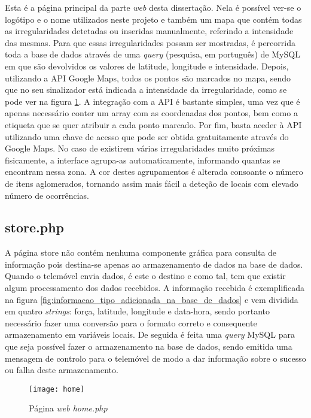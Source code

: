 Esta é a página principal da parte \emph{web} desta dissertação.
Nela é possível ver-se o logótipo e o nome utilizados neste projeto e também um mapa que contém todas as irregularidades detetadas ou inseridas manualmente, referindo a intensidade das mesmas.
Para que essas irregularidades possam ser mostradas, é percorrida toda a base de dados através de uma \emph{query} (pesquisa, em português) de MySQL em que são devolvidos os valores de latitude, longitude e intensidade.
Depois, utilizando a API Google Maps, todos os pontos são marcados no mapa, sendo que no seu sinalizador está indicada a intensidade da irregularidade, como se pode ver na figura \ref{fig:home.php}.
A integração com a API é bastante simples, uma vez que é apenas necessário conter um array com as coordenadas dos pontos, bem como a etiqueta que se quer atribuir a cada ponto marcado.
Por fim, basta aceder à API utilizando uma chave de acesso que pode ser obtida gratuitamente através do Google Maps.
No caso de existirem várias irregularidades muito próximas fisicamente, a interface agrupa-as automaticamente, informando quantas se encontram nessa zona.
A cor destes agrupamentos é alterada consoante o número de itens aglomerados, tornando assim mais fácil a deteção de locais com elevado número de ocorrências.

\subsection{store.php}
\label{sub:store.php}

A página store não contém nenhuma componente gráfica para consulta de informação pois destina-se apenas ao armazenamento de dados na base de dados.
Quando o telemóvel envia dados, é este o destino e como tal, tem que existir algum processamento dos dados recebidos.
A informação recebida é exemplificada na figura \ref{fig:informacao_tipo_adicionada_na_base_de_dados} e vem dividida em quatro \emph{strings}: força, latitude, longitude e data-hora, sendo portanto necessário fazer uma conversão para o formato correto e consequente armazenamento em variáveis locais.
De seguida é feita uma \emph{query} MySQL para que seja possível fazer o armazenamento na base de dados, sendo emitida uma mensagem de controlo para o telemóvel de modo a dar informação sobre o sucesso ou falha deste armazenamento.

\begin{figure}[htp]
	\centering
	\texttt{[image: home]}
	\caption{Página \emph{web home.php}}
	\label{fig:home.php}
\end{figure}

